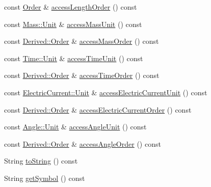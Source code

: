 \begin{DoxyCompactItemize}
\item 
const \hyperlink{classostk_1_1physics_1_1units_1_1_derived_1_1_order}{Order} \& \hyperlink{classostk_1_1physics_1_1units_1_1_derived_1_1_unit_a8a5cfc4bc99fd666134b95fcabe41db0}{access\+Length\+Order} () const
\item 
const \hyperlink{classostk_1_1physics_1_1units_1_1_mass_aa8994892478fdbe6dc78d4bca08db0fa}{Mass\+::\+Unit} \& \hyperlink{classostk_1_1physics_1_1units_1_1_derived_1_1_unit_a9690c481e68ee0b43221872b956eb73a}{access\+Mass\+Unit} () const
\item 
const \hyperlink{classostk_1_1physics_1_1units_1_1_derived_1_1_order}{Derived\+::\+Order} \& \hyperlink{classostk_1_1physics_1_1units_1_1_derived_1_1_unit_a0925bae88750951158517c1e5fb8605f}{access\+Mass\+Order} () const
\item 
const \hyperlink{classostk_1_1physics_1_1units_1_1_time_aa961f0dbca7ec297e19e15e0dfa3bb4a}{Time\+::\+Unit} \& \hyperlink{classostk_1_1physics_1_1units_1_1_derived_1_1_unit_affed7099bc61d3a68e93f3bb0a638edf}{access\+Time\+Unit} () const
\item 
const \hyperlink{classostk_1_1physics_1_1units_1_1_derived_1_1_order}{Derived\+::\+Order} \& \hyperlink{classostk_1_1physics_1_1units_1_1_derived_1_1_unit_a1029ced549b47ac66525f4f08d9b9acb}{access\+Time\+Order} () const
\item 
const \hyperlink{classostk_1_1physics_1_1units_1_1_electric_current_ac57c87a7533dc73b87185b0d9ae6985b}{Electric\+Current\+::\+Unit} \& \hyperlink{classostk_1_1physics_1_1units_1_1_derived_1_1_unit_a13bf6f8a026090ed956a3e294c7f105c}{access\+Electric\+Current\+Unit} () const
\item 
const \hyperlink{classostk_1_1physics_1_1units_1_1_derived_1_1_order}{Derived\+::\+Order} \& \hyperlink{classostk_1_1physics_1_1units_1_1_derived_1_1_unit_a0b3f697f4c6f2573034a837bf78f4fea}{access\+Electric\+Current\+Order} () const
\item 
const \hyperlink{classostk_1_1physics_1_1units_1_1_angle_aea1f8018b1d378b9dee56959d8eb9def}{Angle\+::\+Unit} \& \hyperlink{classostk_1_1physics_1_1units_1_1_derived_1_1_unit_a38e9787eadca312e78314e0b10d30ff2}{access\+Angle\+Unit} () const
\item 
const \hyperlink{classostk_1_1physics_1_1units_1_1_derived_1_1_order}{Derived\+::\+Order} \& \hyperlink{classostk_1_1physics_1_1units_1_1_derived_1_1_unit_a2920a8888f74c82166bee981196e8274}{access\+Angle\+Order} () const
\item 
String \hyperlink{classostk_1_1physics_1_1units_1_1_derived_1_1_unit_a40dfb2ef2a17295b632013628f4403b7}{to\+String} () const
\item 
String \hyperlink{classostk_1_1physics_1_1units_1_1_derived_1_1_unit_ae7b6fe99d772109b1a53d9bdb10b9f69}{get\+Symbol} () const
\end{DoxyCompactItemize}

